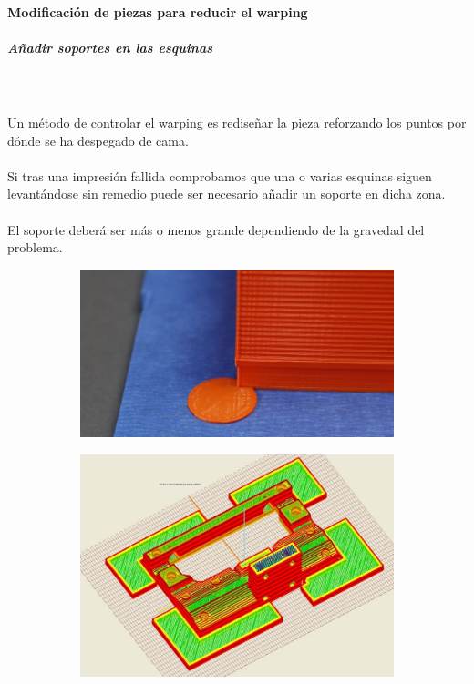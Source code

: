 \documentclass[11pt,a4paper]{article}
\begin{document}
			\paragraph{Modificación de piezas para reducir el warping}
				\subparagraph{Añadir soportes en las esquinas}\mbox{}\\\\
Un método de controlar el warping es rediseñar la pieza reforzando los puntos por dónde se ha despegado de cama.
\\\\
Si tras una impresión fallida comprobamos que una o varias esquinas siguen levantándose sin remedio puede ser necesario añadir un soporte en dicha zona.
\\\\
El soporte deberá ser más o menos grande dependiendo de la gravedad del problema.
\begin{figure}[H]
    \centering
    \begin{subfigure}[b]{0.4\textwidth}
        \includegraphics[width=\textwidth,cfbox=azul_marcos 4pt 0pt]{FOTOS/MOUSEEAR1}
    \end{subfigure}
    \qquad %
    \begin{subfigure}[b]{0.4\textwidth}
        \includegraphics[width=\textwidth,cfbox=azul_marcos 4pt 0pt]{FOTOS/MOUSEEAR2}
    \end{subfigure}   
\end{figure}	
\end{document}
